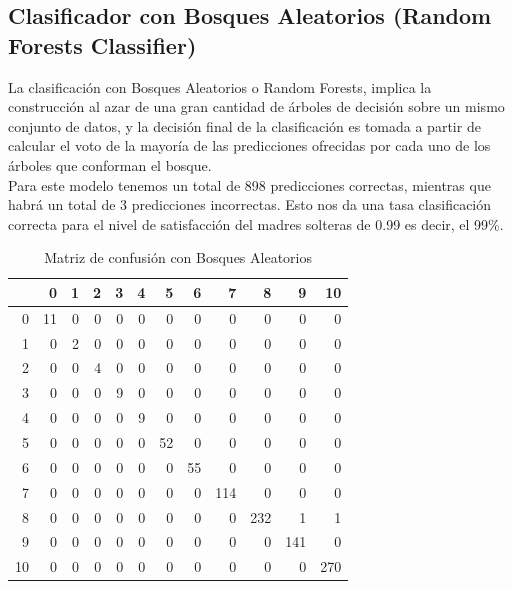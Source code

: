 \documentclass[11pt,twoside]{article}
\begin{document}
\subsection*{Clasificador con Bosques Aleatorios (Random Forests Classifier)}
\noindent
La clasificación con Bosques Aleatorios o Random Forests, implica la construcción al azar de una gran cantidad de árboles de decisión sobre un mismo conjunto de datos, y la decisión final de la clasificación es tomada a partir de calcular el voto de la mayoría de las predicciones ofrecidas por cada uno de los árboles que conforman el bosque.
\\
Para este modelo tenemos un total de 898 predicciones correctas, mientras que habrá un total de 3 predicciones incorrectas. Esto nos da una tasa clasificación correcta para el nivel de satisfacción del madres solteras de  0.99 es decir,  el 99\%.

\begin{table}[H]
	\caption{\small{Matriz de confusión con Bosques Aleatorios}}
	\centering
	\begin{tabular}{r|rrrrrrrrrrr}
		\hline
		& 0 & 1 & 2 & 3 & 4 & 5 & 6 & 7 & 8 & 9 & 10 \\ 
		\hline
		0 &  11 &   0 &   0 &   0 &   0 &   0 &   0 &   0 &   0 &   0 &   0 \\ 
		1 &   0 &   2 &   0 &   0 &   0 &   0 &   0 &   0 &   0 &   0 &   0 \\ 
		2 &   0 &   0 &   4 &   0 &   0 &   0 &   0 &   0 &   0 &   0 &   0 \\ 
		3 &   0 &   0 &   0 &   9 &   0 &   0 &   0 &   0 &   0 &   0 &   0 \\ 
		4 &   0 &   0 &   0 &   0 &   9 &   0 &   0 &   0 &   0 &   0 &   0 \\ 
		5 &   0 &   0 &   0 &   0 &   0 &  52 &   0 &   0 &   0 &   0 &   0 \\ 
		6 &   0 &   0 &   0 &   0 &   0 &   0 &  55 &   0 &   0 &   0 &   0 \\ 
		7 &   0 &   0 &   0 &   0 &   0 &   0 &   0 & 114 &   0 &   0 &   0 \\ 
		8 &   0 &   0 &   0 &   0 &   0 &   0 &   0 &   0 & 232 &   1 &   1 \\ 
		9 &   0 &   0 &   0 &   0 &   0 &   0 &   0 &   0 &   0 & 141 &   0 \\ 
		10 &   0 &   0 &   0 &   0 &   0 &   0 &   0 &   0 &   0 &   0 & 270 \\ 
		\hline
	\end{tabular}
\end{table}
\end{document}
